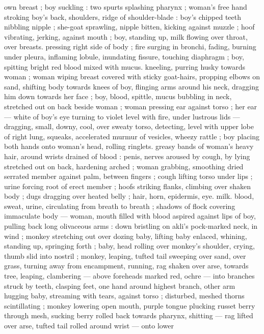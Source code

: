 own breast ; boy suckling : two spurts splashing pharynx ; woman's 
free hand stroking boy's back, shoulders, ridge of shoulder-blade : 
boy's chipped teeth nibbling nipple ; she-goat sprawling, nipple 
bitten, kicking against muzzle ; hoof vibrating, jerking, against 
mouth ; boy, standing up, milk flowing over throat, over breasts. 
pressing right side of body ; fire surging in bronchi, fading, burning 
under pleura, inflaming lobule, inundating fissure, touching 
diaphragm ; boy, spitting bright red blood mixed with mucus. 
kneeling, purring husky towards woman ; woman wiping breast 
covered with sticky goat-hairs, propping elbows on sand, shifting 
body towards knees of boy, flinging arms around his neck, dragging 
him down towards her face ; boy, blood, spittle, mucus bubbling in 
neck, stretched out on back beside woman ; woman pressing ear 
against torso ; her ear --- white of boy's eye turning to violet level 
with fire, under lustrous lids --- dragging, small, downy, cool, over 
sweaty torso, detecting, level with upper lobe of right lung, squeaks, 
accelerated murmur of vesicles, wheezy rattle ; boy placing both 
hands onto woman's head, rolling ringlets. greasy bands of woman's 
heavy hair, around wrists drained of blood : penis, nerves aroused by 
cough, by lying stretched out on back, hardening arched ; woman 
grabbing, smoothing dried serrated member against palm, between 
fingers ; cough lifting torso under lips ; urine forcing root of erect 
member ; hoofs striking flanks, climbing over shaken body ; dugs 
dragging over heated belly ; hair, horn, epidermis, eye. milk. blood, 
sweat, urine, circulating from breath to breath ; shadows of flock 
covering immaculate body --- woman, mouth filled with blood aspired 
against lips of boy, pulling back long olivaceous arms : down bristling 
on akli's pock-marked neck, in wind ; monkey stretching out over 
dozing baby, lifting baby enlaced, whining, standing up, springing 
forth ; baby, head rolling over monkey's shoulder, crying, thumb slid 
into nostril ; monkey, leaping, tufted tail sweeping over sand, over 
grass, turning away from encampment, running, rag shaken over 
arse, towards tree, leaping, clambering --- above foreheads marked 
red, ochre --- into branches struck by teeth, clasping feet, one hand 
around highest branch, other arm hugging baby, streaming with 
tears, against torso ; disturbed, meshed thorns scintillating ; monkey 
lowering open mouth, purple tongue plucking russet berry through 
mesh, sucking berry rolled back towards pharynx, shitting --- rag 
lifted over arse, tufted tail rolled around wrist --- onto lower 

